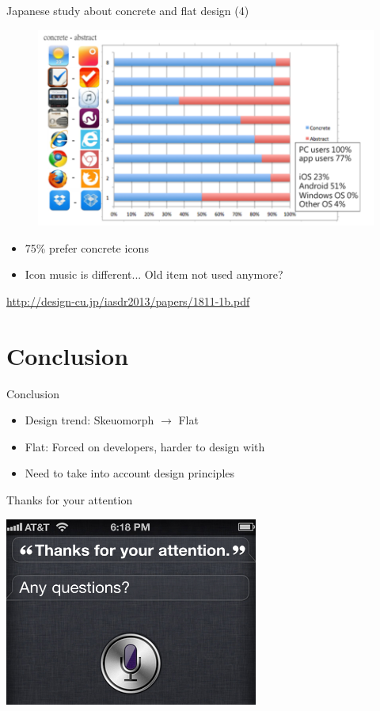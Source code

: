 \documentclass{beamer}
\begin{document}
\begin{frame}{Japanese study about concrete and flat design (4)}
	\begin{figure}
    	\centering
        \includegraphics[scale=0.6]{finalStat.png}
    \end{figure}
    \begin{itemize}
        \item 75\% prefer concrete icons
		\item Icon music is different... Old item not used anymore?
    \end{itemize}
	\begin{flushright}\tiny\url{http://design-cu.jp/iasdr2013/papers/1811-1b.pdf}\normalsize\end{flushright}
\end{frame}

\section*{Conclusion}

\begin{frame}{Conclusion}

\begin{itemize}
    \item Design trend: Skeuomorph $\rightarrow$ Flat
    \item Flat: Forced on developers, harder to design with
    \item Need to take into account design principles
\end{itemize}

\end{frame}

\begin{frame}{Thanks for your attention}
    \begin{center}
        \includegraphics[width=.5\textwidth]{end_question.png}
    \end{center}
\end{frame}


%
%
\end{document}
